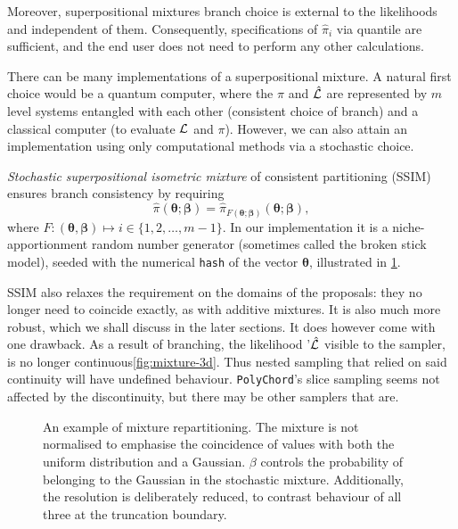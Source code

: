 \documentclass[usenatbib]{mnras}
\begin{document}
Moreover, superpositional mixtures branch choice is external to the
likelihoods and independent of them. Consequently, specifications of
$\hat{\pi}_{i}$ via quantile are sufficient, and the end user does not
need to perform any other calculations.

There can be many implementations of a superpositional mixture. A
natural first choice would be a quantum computer, where the
$\hat{\pi}$ and $\hat{\cal L}$ are represented by \(m\) level
systems entangled with each other (consistent choice of branch) and a
classical computer (to evaluate ${\cal L}$ and $\pi$). However, we can
also attain an implementation using only computational methods via a
stochastic choice.

\emph{Stochastic superpositional isometric mixture} of consistent
partitioning (SSIM) ensures branch consistency by requiring
\begin{equation}
\hat{\pi}(\bm{\theta}; \bm{\beta}) = \hat{\pi}_{F(\bm{\theta};
  \bm{\beta})}(\bm{\theta};\bm{\beta}),
\end{equation}
where
$F: (\bm{\theta}, \bm{\beta}) \mapsto i \in \{1, 2, \ldots, m-1\}$. In
our implementation it is a niche-apportionment random number generator
(sometimes called the broken stick model), seeded with the numerical
\texttt{hash} of the vector $\bm{\theta}$, illustrated in
\cref{fig:mixture}.

SSIM also relaxes the requirement on the domains of the proposals:
they no longer need to coincide exactly, as with additive mixtures.
It is also much more robust, which we shall discuss in the later
sections. It does however come with one drawback. As a result of
branching, the likelihood '$\hat{\cal L}$ visible to the sampler, is
no longer continuous\cref{fig:mixture-3d}. Thus nested sampling that
relied on said continuity will have undefined
behaviour. \texttt{PolyChord}'s slice sampling seems not affected by
the discontinuity, but there may be other samplers that are.
\begin{figure}  
  

  

  
  \caption{An example of mixture repartitioning. The mixture is not
    normalised to emphasise the coincidence of values with both the
    uniform distribution and a Gaussian. $\beta$ controls the
    probability of belonging to the Gaussian in the stochastic
    mixture.  Additionally, the resolution is deliberately reduced, to
    contrast behaviour of all three at the truncation
    boundary. \label{fig:mixture}}
\end{figure}
\end{document}
